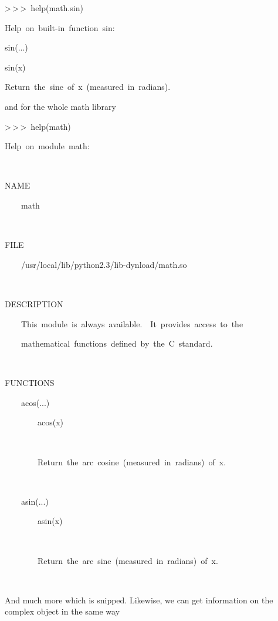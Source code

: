 \begin{lyxcode}
>\,{}>\,{}>~help(math.sin)~

Help~on~built-in~function~sin:

sin(...)

sin(x)

Return~the~sine~of~x~(measured~in~radians).
\end{lyxcode}
and for the whole math library

\begin{lyxcode}
>\,{}>\,{}>~help(math)~

Help~on~module~math:

~

NAME

~~~~math

~

FILE

~~~~/usr/local/lib/python2.3/lib-dynload/math.so

~

DESCRIPTION

~~~~This~module~is~always~available.~~It~provides~access~to~the

~~~~mathematical~functions~defined~by~the~C~standard.

~

FUNCTIONS

~~~~acos(...)

~~~~~~~~acos(x)

~~~~~~~~~

~~~~~~~~Return~the~arc~cosine~(measured~in~radians)~of~x.

~~~~~

~~~~asin(...)

~~~~~~~~asin(x)

~~~~~~~~~

~~~~~~~~Return~the~arc~sine~(measured~in~radians)~of~x.

~~~~~
\end{lyxcode}
And much more which is snipped. Likewise, we can get information on
the complex object in the same way

